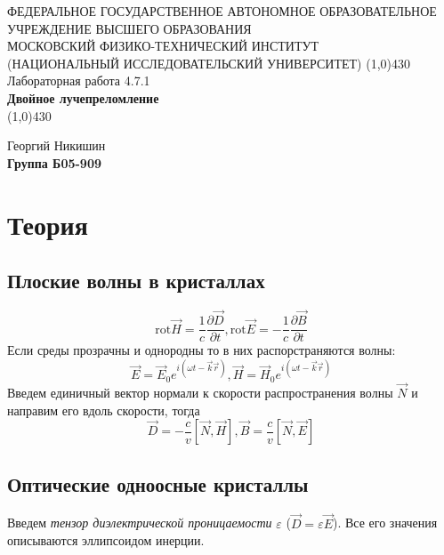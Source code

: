 \documentclass[11pt]{article}
\begin{document}
\begin{titlepage}
\begin{center}
\large{\small ФЕДЕРАЛЬНОЕ ГОСУДАРСТВЕННОЕ АВТОНОМНОЕ ОБРАЗОВАТЕЛЬНОЕ\\ УЧРЕЖДЕНИЕ ВЫСШЕГО ОБРАЗОВАНИЯ\\ МОСКОВСКИЙ ФИЗИКО-ТЕХНИЧЕСКИЙ ИНСТИТУТ\\ (НАЦИОНАЛЬНЫЙ ИССЛЕДОВАТЕЛЬСКИЙ УНИВЕРСИТЕТ)}
\vfill
\line(1,0){430}\\[1mm]
\huge{Лабораторная работа 4.7.1}\\
\huge\textbf{Двойное лучепреломление}\\
\line(1,0){430}\\[1mm]
\vfill
\begin{flushright}
	\normalsize{Георгий Никишин  }\\
	\normalsize{\textbf{Группа Б05-909}}\\
\end{flushright}
\end{center}
\end{titlepage}
\section*{Теория}
\subsection*{Плоские волны в кристаллах}
\begin{equation}
\text{rot} \vec{H} = \dfrac{1}{c}\dfrac{\partial \vec{D}}{\partial t}, \text{rot} \vec{E} = -\dfrac{1}{c}\dfrac{\partial \vec{B}}{\partial t}
\end{equation}
Если среды прозрачны и однородны то в них распорстраняются волны:
\begin{equation}
\vec E = \vec{E}_0 e^{i(\omega t - \vec{k}\vec{r})}, \vec{H} = \vec{H}_0e^{i(\omega t - \vec{k}\vec{r})}
\end{equation}
Введем единичный вектор нормали к скорости распространения волны $\vec{N}$ и направим его вдоль скорости, тогда
\begin{equation}
\vec{D} = -\dfrac{c}{v}\left[\vec{N}, \vec{H}\right], \vec{B} = \dfrac{c}{v}\left[	\vec{N}, \vec{E}\right]
\end{equation}
\subsection*{Оптические одноосные кристаллы}
Введем \textit{тензор диэлектрической проницаемости} $\varepsilon$ ($\vec{D} = \varepsilon \vec{E}$). Все его значения описываются эллипсоидом инерции. 
\end{document}
